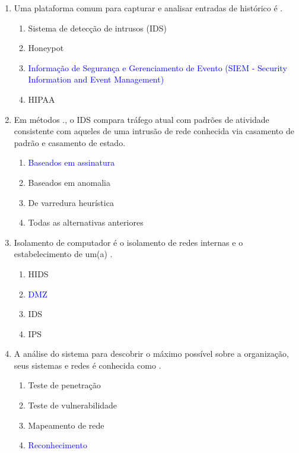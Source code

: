 \documentclass{report}
\begin{document}
\begin{enumerate}
		\item Uma plataforma comum para capturar e analisar entradas de histórico é .
		\begin{enumerate}[label=(\alph*)]
			\item Sistema de detecção de intrusos (IDS)
			\item Honeypot
			\item \textcolor{blue}{Informação de Segurança e Gerenciamento de Evento (SIEM - Security Information and Event Management)}
			\item HIPAA
		\end{enumerate}
		
		\item Em métodos ., o IDS compara tráfego atual com padrões de atividade consistente com aqueles de uma intrusão de rede conhecida via casamento de padrão e casamento de estado.
		\begin{enumerate}[label=(\alph*)]
			\item \textcolor{blue}{Baseados em assinatura}
			\item Baseados em anomalia
			\item De varredura heurística
			\item Todas as alternativas anteriores
		\end{enumerate}
		
		\item Isolamento de computador é o isolamento de redes internas e o estabelecimento de um(a) .
		\begin{enumerate}[label=(\alph*)]
			\item HIDS
			\item \textcolor{blue}{DMZ}
			\item IDS
			\item IPS
		\end{enumerate}
		
		\item A análise do sistema para descobrir o máximo possível sobre a organização, seus sistemas e redes é conhecida como .
		\begin{enumerate}[label=(\alph*)]
			\item Teste de penetração
			\item Teste de vulnerabilidade
			\item Mapeamento de rede
			\item \textcolor{blue}{Reconhecimento}
		\end{enumerate}
		
	\end{enumerate}
	
	
	
	
\end{document}
